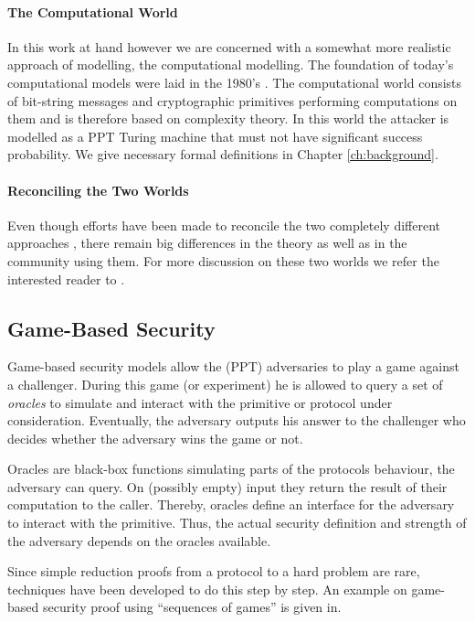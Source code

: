 \paragraph{The Computational World}
In this work at hand however we are concerned with a somewhat more realistic approach of modelling, the computational modelling.
The foundation of today's computational models were laid in the 1980's \cite{Goldwasser82,Goldwasser84,Yao82,Blum82}.
The computational world consists of bit-string messages and cryptographic primitives performing computations on them and is therefore based on complexity theory.
In this world the attacker is modelled as a \ac{PPT} Turing machine \cite{Turing37} that must not have significant success probability.
We give necessary formal definitions in Chapter \ref{ch:background}.
%

\paragraph{Reconciling the Two Worlds}
Even though efforts have been made to reconcile the two completely different approaches \cite{Abadi2002,Herzog2005}, there remain big differences in the theory as well as in the community using them.
For more discussion on these two worlds we refer the interested reader to \cite{cortier2011survey}.

\subsection{Game-Based Security}
Game-based security models allow the (\ac{PPT}) adversaries to play a game against a challenger.
During this game (or experiment) he is allowed to query a set of \emph{oracles} to simulate and interact with the primitive or protocol under consideration.
Eventually, the adversary outputs his answer to the challenger who decides whether the adversary wins the game or not.

Oracles are black-box functions simulating parts of the protocols behaviour, the adversary can query.
On (possibly empty) input they return the result of their computation to the caller.
Thereby, oracles define an interface for the adversary to interact with the primitive.
Thus, the actual security definition and strength of the adversary depends on the oracles available.

Since simple reduction proofs from a protocol to a hard problem are rare, techniques have been developed to do this step by step.
An example on game-based security proof using ``sequences of games'' is given in\cite{Shoup2004}.

